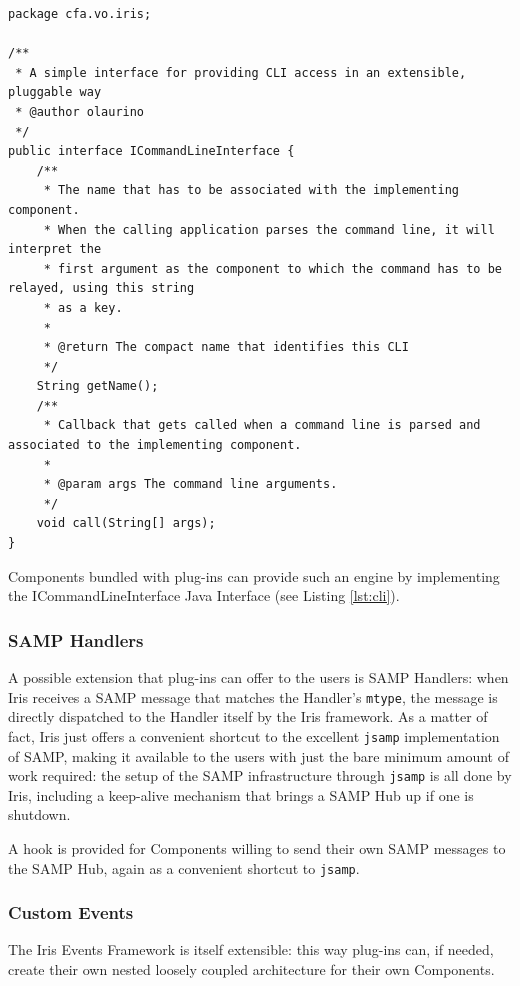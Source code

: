 \documentclass[final,5p]{elsarticle}
\begin{document}
\begin{lstlisting}[style=java,
	caption={Every Iris component can expose a command line interface. Iris dispatches the command line arguments for the relative component to process.},
	label=lst:cli]
package cfa.vo.iris;

/**
 * A simple interface for providing CLI access in an extensible, pluggable way
 * @author olaurino
 */
public interface ICommandLineInterface {
    /**
     * The name that has to be associated with the implementing component.
     * When the calling application parses the command line, it will interpret the
     * first argument as the component to which the command has to be relayed, using this string
     * as a key.
     *
     * @return The compact name that identifies this CLI
     */
    String getName();
    /**
     * Callback that gets called when a command line is parsed and associated to the implementing component.
     *
     * @param args The command line arguments.
     */
    void call(String[] args);
}
\end{lstlisting}


Components bundled with plug-ins can provide such an engine by implementing the ICommandLineInterface Java Interface (see Listing \ref{lst:cli}).

\subsubsection{SAMP Handlers}
A possible extension that plug-ins can offer to the users is SAMP Handlers: when Iris receives a SAMP message that matches the Handler's \verb|mtype|, the message is directly dispatched to the Handler itself by the Iris framework. As a matter of fact, Iris just offers a convenient shortcut to the excellent \verb|jsamp| implementation of SAMP, making it available to the users with just the bare minimum amount of work required: the setup of the SAMP infrastructure through \verb|jsamp| is all done by Iris, including a keep-alive mechanism that brings a SAMP Hub up if one is shutdown.

A hook is provided for Components willing to send their own SAMP messages to the SAMP Hub, again as a convenient shortcut to \verb|jsamp|.

\subsubsection{Custom Events}
The Iris Events Framework is itself extensible: this way plug-ins can, if needed, create their own nested loosely coupled architecture for their own Components.
\end{document}
